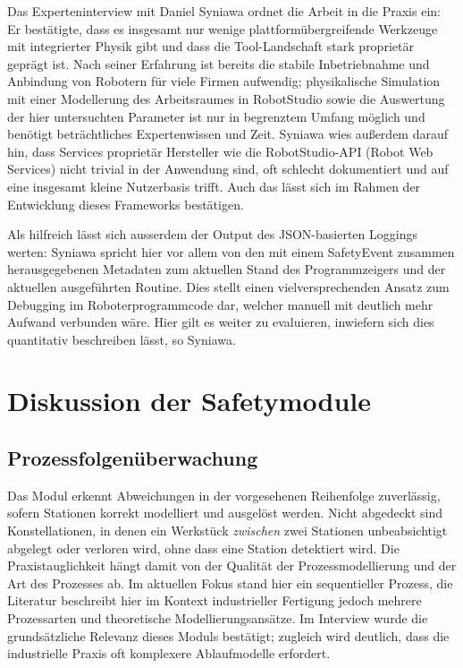 \noindent Das Experteninterview mit Daniel Syniawa ordnet die Arbeit in die
Praxis ein: Er bestätigte, dass es insgesamt nur wenige plattformübergreifende
Werkzeuge mit integrierter Physik gibt und dass die Tool-Landschaft stark
proprietär geprägt ist. Nach seiner Erfahrung ist bereits die stabile
Inbetriebnahme und Anbindung von Robotern für viele Firmen aufwendig;
physikalische Simulation mit einer Modellerung des Arbeitsraumes in RobotStudio
sowie die Auswertung der hier untersuchten Parameter ist nur in begrenztem
Umfang möglich und benötigt beträchtliches Expertenwissen und Zeit. Syniawa wies
außerdem darauf hin, dass Services proprietär Hersteller wie die RobotStudio-API
(Robot Web Services) nicht trivial in der Anwendung sind, oft schlecht
dokumentiert und auf eine insgesamt kleine Nutzerbasis trifft. Auch das lässt
sich im Rahmen der Entwicklung dieses Frameworks bestätigen.

Als hilfreich lässt sich ausserdem der Output des JSON-basierten Loggings
werten: Syniawa spricht hier vor allem von den mit einem SafetyEvent zusammen
herausgegebenen Metadaten zum aktuellen Stand des Programmzeigers und der aktuellen
ausgeführten Routine. Dies stellt einen vielversprechenden Ansatz zum Debugging
im Roboterprogrammcode dar, welcher manuell mit deutlich mehr Aufwand verbunden
wäre. Hier gilt es weiter zu evaluieren, inwiefern sich dies quantitativ
beschreiben lässt, so Syniawa.

\section{Diskussion der Safetymodule}

\subsection{Prozessfolgenüberwachung}

Das Modul erkennt Abweichungen in der vorgesehenen Reihenfolge zuverlässig,
sofern Stationen korrekt modelliert und ausgelöst werden. Nicht abgedeckt sind
Konstellationen, in denen ein Werkstück \emph{zwischen} zwei Stationen
unbeabsichtigt abgelegt oder verloren wird, ohne dass eine Station detektiert
wird. Die Praxistauglichkeit hängt damit von der Qualität der
Prozessmodellierung und der Art des Prozesses ab. Im aktuellen Fokus stand hier
ein sequentieller Prozess, die Literatur beschreibt hier im Kontext
industrieller Fertigung jedoch mehrere Prozessarten und theoretische
Modellierungsansätze. Im Interview wurde die grundsätzliche Relevanz dieses
Moduls bestätigt; zugleich wird deutlich, dass die industrielle Praxis oft
komplexere Ablaufmodelle erfordert.

